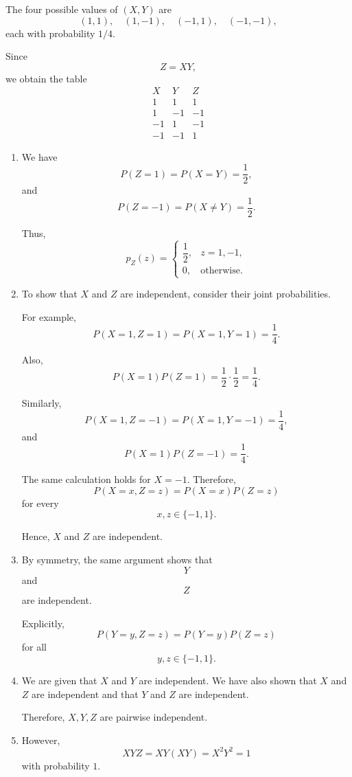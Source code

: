 \documentclass[11pt]{article}
\newenvironment{solution}{
    \par
    \begin{tcolorbox}[
        colback=white,
        colframe=uwgold,
        boxrule=0.7pt,
        arc=2mm,
        left=3mm,
        right=3mm,
        top=2mm,
        bottom=2mm,
        breakable,
        before skip=0.5em,
        after skip=1em,
        title=\textbf{Solution},
        coltitle=uwpurple,
        fonttitle=\bfseries
    ]
}{
    \end{tcolorbox}
}
\begin{document}
\begin{solution}

The four possible values of \((X,Y)\) are
\[
(1,1),\quad
(1,-1),\quad
(-1,1),\quad
(-1,-1),
\]
each with probability \(1/4\).

Since
\[
Z=XY,
\]
we obtain the table
\[
\begin{array}{c|c|c}
X & Y & Z\\
\hline
1 & 1 & 1\\
1 & -1 & -1\\
-1 & 1 & -1\\
-1 & -1 & 1
\end{array}
\]

\begin{enumerate}[label=(\alph*)]

\item We have
\[
P(Z=1)
=
P(X=Y)
=
\frac12,
\]
and
\[
P(Z=-1)
=
P(X\neq Y)
=
\frac12.
\]

Thus,
\[
p_Z(z)
=
\begin{cases}
\dfrac12,
&
z=1,-1,\\
0,
&
\text{otherwise}.
\end{cases}
\]

\item To show that \(X\) and \(Z\) are independent, consider their joint
probabilities.

For example,
\[
P(X=1,Z=1)
=
P(X=1,Y=1)
=
\frac14.
\]

Also,
\[
P(X=1)P(Z=1)
=
\frac12\cdot\frac12
=
\frac14.
\]

Similarly,
\[
P(X=1,Z=-1)
=
P(X=1,Y=-1)
=
\frac14,
\]
and
\[
P(X=1)P(Z=-1)
=
\frac14.
\]

The same calculation holds for \(X=-1\). Therefore,
\[
P(X=x,Z=z)
=
P(X=x)P(Z=z)
\]
for every
\[
x,z\in\{-1,1\}.
\]

Hence, \(X\) and \(Z\) are independent.

\item By symmetry, the same argument shows that
\[
Y
\]
and
\[
Z
\]
are independent.

Explicitly,
\[
P(Y=y,Z=z)
=
P(Y=y)P(Z=z)
\]
for all
\[
y,z\in\{-1,1\}.
\]

\item We are given that \(X\) and \(Y\) are independent. We have also shown
that \(X\) and \(Z\) are independent and that \(Y\) and \(Z\) are
independent.

Therefore, \(X,Y,Z\) are pairwise independent.

\item However,
\[
XYZ
=
XY(XY)
=
X^2Y^2
=
1
\]
with probability \(1\).


\end{enumerate}
\end{solution}
\end{document}
